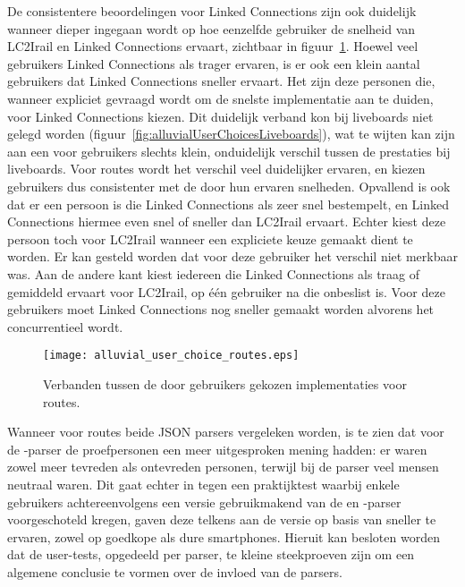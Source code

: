 De consistentere beoordelingen voor Linked Connections zijn ook duidelijk wanneer dieper ingegaan wordt op hoe eenzelfde gebruiker de snelheid van LC2Irail en Linked Connections ervaart, zichtbaar in figuur~\ref{fig:alluvialUserChoicesRoutes}. Hoewel veel gebruikers Linked Connections als trager ervaren, is er ook een klein aantal gebruikers dat Linked Connections sneller ervaart. Het zijn deze personen die, wanneer expliciet gevraagd wordt om de snelste implementatie aan te duiden, voor Linked Connections kiezen. Dit duidelijk verband kon bij liveboards niet gelegd worden (figuur~\ref{fig:alluvialUserChoicesLiveboards}), wat te wijten kan zijn aan een voor gebruikers slechts klein, onduidelijk verschil tussen de prestaties bij liveboards. Voor routes wordt het verschil veel duidelijker ervaren, en kiezen gebruikers dus consistenter met de door hun ervaren snelheden.
Opvallend is ook dat er een persoon is die Linked Connections als zeer snel bestempelt, en Linked Connections hiermee even snel of sneller dan LC2Irail ervaart. Echter kiest deze persoon toch voor LC2Irail wanneer een expliciete keuze gemaakt dient te worden. Er kan gesteld worden dat voor deze gebruiker het verschil niet merkbaar was. Aan de andere kant kiest iedereen die Linked Connections als traag of gemiddeld ervaart voor LC2Irail, op één gebruiker na die onbeslist is. Voor deze gebruikers moet Linked Connections nog sneller gemaakt worden alvorens het concurrentieel wordt.

\begin{figure}[ht]
	\centering
	\texttt{[image: alluvial\_user\_choice\_routes.eps]}
	\caption[Door gebruikers gekozen implementatie voor routes]{Verbanden tussen de door gebruikers gekozen implementaties voor routes. }
	\label{fig:alluvialUserChoicesRoutes}
\end{figure}

Wanneer voor routes beide JSON parsers vergeleken worden, is te zien dat voor de -parser de proefpersonen een meer uitgesproken mening hadden: er waren zowel meer tevreden als ontevreden personen, terwijl bij de  parser veel mensen neutraal waren. Dit gaat echter in tegen een praktijktest waarbij enkele gebruikers achtereenvolgens een versie gebruikmakend van de  en -parser voorgeschoteld kregen, gaven deze telkens aan de versie op basis van  sneller te ervaren, zowel op goedkope als dure smartphones. Hieruit kan besloten worden dat de user-tests, opgedeeld per parser, te kleine steekproeven zijn om een algemene conclusie te vormen over de invloed van de parsers.

